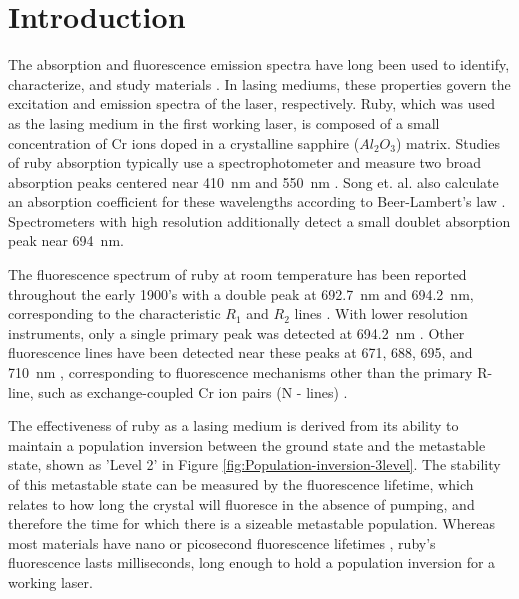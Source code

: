 \documentclass[11pt, a4paper, twocolumn]{article}
\author[1]{William Cutler}
\author[1]{John Donaghue}
\author[1*]{Haridas Kumarakuru}
\author[1*]{Don Heiman}
\affil[1]{\small{\textit{Department of Physics, Northeastern University, Boston, MA 02115, USA}}}
\affil[*]{\small{\textit{Corresponding  authors: h.kumarakuru@northeastern.edu, d.heiman@northeastern.edu}}}
\begin{document}

\twocolumn[
  \begin{@twocolumnfalse}
    \maketitle
    \begin{abstract}
      \abstractText
      \newline
      \newline
    \end{abstract}
  \end{@twocolumnfalse}
]


\section*{Introduction}
The absorption and fluorescence emission spectra have long been used to identify, characterize, and study materials \cite{BrittanicaSpectroscopy}. In lasing mediums, these properties govern the excitation and emission spectra of the laser, respectively. Ruby, which was used as the lasing medium in the first working laser, is composed of a small concentration of Cr ions doped in a crystalline sapphire ($Al_2O_3$) matrix. Studies of ruby absorption typically use a spectrophotometer and measure two broad absorption peaks centered near \SI{410}{\nm} and \SI{550}{\nm} \cite{Esposti,Kusuma,Song}. Song et. al. also calculate an absorption coefficient for these wavelengths according to Beer-Lambert's law \cite{Song}. Spectrometers with high resolution additionally detect a small doublet absorption peak near \SI{694}{\nm}.

The fluorescence spectrum of ruby at room temperature has been reported throughout the early 1900's with a double peak at \SI{692.7}{\nm} and \SI{694.2}{\nm}, corresponding to the characteristic $R_1$ and $R_2$ lines \cite{Kumari, Mani}. With lower resolution instruments, only a single primary peak was detected at \SI{694.2}{\nm} \cite{Esposti}. Other fluorescence lines have been detected near these peaks at 671, 688, 695, and \SI{710}{\nm} \cite{Kusuma}, corresponding to fluorescence mechanisms other than the primary R-line, such as exchange-coupled Cr ion pairs (N - lines) \cite{Yamaoka}.

The effectiveness of ruby as a lasing medium is derived from its ability to maintain a population inversion between the ground state and the metastable state, shown as 'Level 2' in Figure \ref{fig:Population-inversion-3level}. The stability of this metastable state can be measured by the fluorescence lifetime, which relates to how long the crystal will fluoresce in the absence of pumping, and therefore the time for which there is a sizeable metastable population. Whereas most materials have nano or picosecond fluorescence lifetimes \cite{Berezin}, ruby’s fluorescence lasts milliseconds, long enough to hold a population inversion for a working laser.
\end{document}
